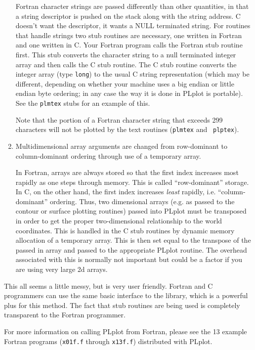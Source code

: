 \begin{enumerate}
Fortran character strings are passed differently than other quantities, in
that a string descriptor is pushed on the stack along with the string
address.  C doesn't want the descriptor, it wants a NULL terminated string.
For routines that handle strings two stub routines are necessary, one
written in Fortran and one written in C.  Your Fortran program calls the
Fortran stub routine first.  This stub converts the character string to a
null terminated integer array and then calls the C stub routine.  The C
stub routine converts the integer array (type {\tt long}) to the usual C
string representation (which may be different, depending on whether your
machine uses a big endian or little endian byte ordering; in any case the
way it is done in PLplot is portable).  See the {\tt plmtex} stubs for an
example of this. 

Note that the portion of a Fortran character string that exceeds 299
characters will not be plotted by the text routines ({\tt plmtex} and {\tt
plptex}). 

\item Multidimensional array arguments are changed from row-dominant to
column-dominant ordering through use of a temporary array.

In Fortran, arrays are always stored so that the first index increases most
rapidly as one steps through memory.  This is called ``row-dominant''
storage.  In C, on the other hand, the first index increases {\em least\/}
rapidly, i.e. ``column-dominant'' ordering.  Thus, two dimensional arrays
(e.g.  as passed to the contour or surface plotting routines) passed into
PLplot must be transposed in order to get the proper two-dimensional
relationship to the world coordinates.  This is handled in the C stub
routines by dynamic memory allocation of a temporary array.  This is then set
equal to the transpose of the passed in array and passed to the appropriate
PLplot routine.  The overhead associated with this is normally not important
but could be a factor if you are using very large 2d arrays.
\end{enumerate}

This all seems a little messy, but is very user friendly.  Fortran and C
programmers can use the same basic interface to the library, which is a
powerful plus for this method.  The fact that stub routines are being used
is completely transparent to the Fortran programmer.

For more information on calling PLplot from Fortran, please see the 13
example Fortran programs ({\tt x01f.f} through {\tt x13f.f}) distributed
with PLplot.
